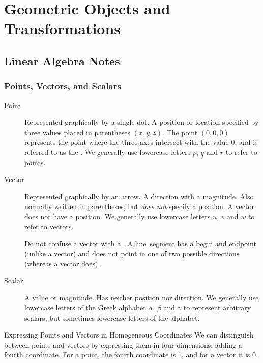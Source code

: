 \documentclass[../COS3712_Notes.tex]{subfiles}
\begin{document}
  \setcounter{chapter}{3}
  \chapter{Geometric Objects and Transformations}
    \section{Linear Algebra Notes}
      \subsection{Points, Vectors, and Scalars}
        \begin{description}
          \item[Point] Represented graphically by a single dot.
            A position or location specified by three values placed in parentheses $(x, y, z)$.
            The point $(0, 0, 0)$ represents the point where the three axes intersect
            with the value 0, and is referred to as the .
            We generally use lowercase letters $p$, $q$ and $r$ to refer to points.
          \item[Vector] Represented graphically by an arrow.
            A direction with a magnitude.
            Also normally written in parentheses, but \emph{does not} specify a position.
            A vector does not have a position.
            We generally use lowercase letters $u$, $v$ and $w$ to refer to vectors.

            Do not confuse a vector with a .
            A line~segment has a begin and endpoint (unlike a vector)
            and does not point in one of two possible directions
            (whereas a vector does).
          \item[Scalar] A value or magnitude.
            Has neither position nor direction.
            We generally use lowercase letters of the Greek alphabet $\alpha$, $\beta$ and $\gamma$
            to represent arbitrary scalars, but sometimes lowercase letters of the alphabet.
        \end{description}

        \begin{sidenote}{Expressing Points and Vectors in Homogeneous Coordinates}
          We can distinguish between points and vectors by expressing them in four dimensions:
          adding a fourth coordinate.
          For a point, the fourth coordinate is 1, and for a vector it is 0.
        \end{sidenote}
\end{document}
